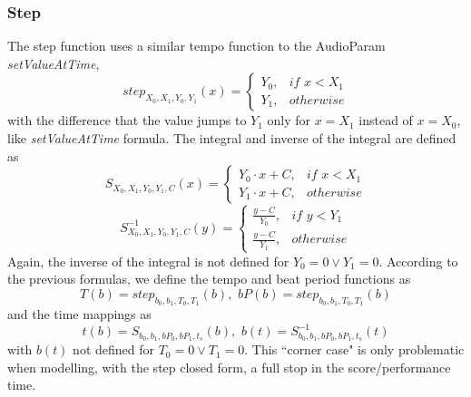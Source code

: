 \documentclass{sig-alternate}
\begin{document}
\subsubsection{Step}
The step function uses a similar tempo function to the AudioParam \textit{setValueAtTime},
\begin{equation}
step_{X_0,X_1,Y_0,Y_1}(x) = \left\{\begin{array}{lll}
	Y_{0}, & if\,\,x<X_1\\
	Y_{1}, & otherwise
            \end{array}\right.
\end{equation}
with the difference that the value jumps to $Y_1$ only for $x=X_1$ instead of $x=X_0$, like \textit{setValueAtTime} formula. The integral and inverse of the integral are defined as 
\begin{equation}
S_{X_0,X_1,Y_0,Y_1,C}(x) = \left\{\begin{array}{lll}
	Y_0 \cdot x + C, & if\,\,x<X_1\\
	Y_1 \cdot x + C, & otherwise
            \end{array}\right.
\end{equation}
\begin{equation}
S_{X_0,X_1,Y_0,Y_1,C}^{-1}(y) = \left\{\begin{array}{lll}
	\frac{y - C}{Y_0}, & if\,\,y<Y_1\\
	\frac{y - C}{Y_1}, & otherwise
            \end{array}\right.
\end{equation}
Again, the inverse of the integral is not defined for $Y_0 = 0 \lor Y_1 = 0$.  According to the previous formulas, we define the tempo and beat period functions as
\begin{displaymath}
T(b)=step_{b_0,b_1,T_0,T_1}(b),\,\,bP(b)=step_{b_0,b_1,T_0,T_1}(b)
\end{displaymath}
and the time mappings as 
\begin{displaymath}
t(b) = S_{b_0,b_1,bP_0,bP_1,t_s}(b),\,\,b(t) = S_{b_0,b_1,bP_0,bP_1,t_s}^{-1}(t)
\end{displaymath}
with $b(t)$ not defined for $T_0 = 0 \lor T_1 = 0$. This ``corner case" is only problematic when modelling, with the step closed form, a full stop in the score/performance time.
\end{document}
